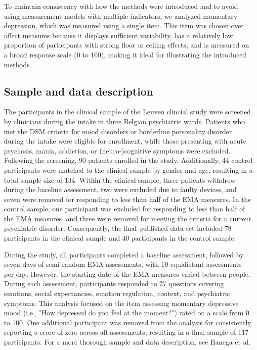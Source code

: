 \documentclass[man, floatsintext]{apa7}
\begin{document}
To maintain consistency with how the methods were introduced and to avoid using
measurement models with multiple indicators, we analyzed momentary
depression, which was measured using a single item. This item was chosen over
affect measures because it displays sufficient variability, has a relatively
low proportion of participants with strong floor or ceiling effects, and is
measured on a broad response scale (0 to 100), making it ideal for illustrating
the introduced methods.

\subsection{Sample and data description}

The participants in the clinical sample of the Leuven clincial study were
screened by clinicians during the intake
in three Belgian psychiatric wards. Patients who met the DSM
criteria for mood disorders or borderline personality disorder during the
intake were eligible for enrollment, while those presenting with acute
psychosis, mania, addiction, or (neuro-)cognitive symptoms were excluded.
Following the screening, 90 patients enrolled in the study. Additionally, 44
control participants were matched to the clinical sample by gender and age,
resulting in a total sample size of 134.
Within the clinical sample, three patients withdrew during the baseline
assessment, two were excluded due to faulty devices, and seven were removed for
responding to less than half of the EMA measures. In the control sample, one
participant was excluded for responding to less than half of the EMA measures,
and three were removed for meeting the criteria for a current psychiatric
disorder. Consequently, the final published data set included 78 participants
in the clinical sample and 40 participants in the control sample.

During the study, all participants completed a baseline assessment, followed by
seven days of semi-random EMA assessments, with 10 equidistant assessments per
day. However, the starting date of the EMA measures varied between people.
During each assessment, participants responded to 27 questions covering
emotions, social expectancies, emotion regulation, context, and psychiatric
symptoms. This analysis focused on the item assessing momentary depressive mood
(i.e., "How depressed do you feel at the moment?") rated on a scale from 0 to
100. One additional participant was removed from the analysis for consistently
reporting a score of zero across all assessments, resulting in a final sample
of 117 participants. For a more thorough sample and data description, see
Hanega et al.
\end{document}

